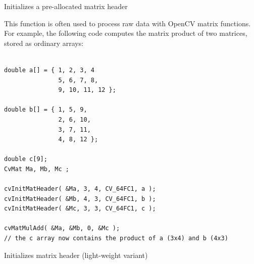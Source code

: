 Initializes a pre-allocated matrix header


\begin{description}
\end{description}

This function is often used to process raw data with OpenCV matrix functions. For example, the following code computes the matrix product of two matrices, stored as ordinary arrays:

\begin{lstlisting}

double a[] = { 1, 2, 3, 4
               5, 6, 7, 8,
               9, 10, 11, 12 };

double b[] = { 1, 5, 9,
               2, 6, 10,
               3, 7, 11,
               4, 8, 12 };

double c[9];
CvMat Ma, Mb, Mc ;

cvInitMatHeader( &Ma, 3, 4, CV_64FC1, a );
cvInitMatHeader( &Mb, 4, 3, CV_64FC1, b );
cvInitMatHeader( &Mc, 3, 3, CV_64FC1, c );

cvMatMulAdd( &Ma, &Mb, 0, &Mc );
// the c array now contains the product of a (3x4) and b (4x3)

\end{lstlisting}

\label{Mat}

Initializes matrix header (light-weight variant)


